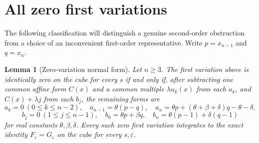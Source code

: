 \documentclass[11pt]{article}
\newtheorem{lemma}[theorem]{Lemma}
\begin{document}
\section{All zero first variations}

The following classification will distinguish a genuine second-order
obstruction from a choice of an inconvenient first-order representative.
Write $p=x_{n-1}$ and $q=x_n$.

\begin{lemma}[Zero-variation normal form]
Let $n\ge3$. The first variation above is identically zero on the cube
for every $s$ if and only if, after subtracting one common affine form
$C(x)$ and a common multiple $\lambda u_k(x)$ from each $a_k$, and
$C(x)+\lambda j$ from each $b_j$, the remaining forms are
\[
 a_k=0\ (0\le k\le n-2),\quad
 a_{n-1}=\theta(p-q),\quad
 a_n=\theta p+(\theta+\beta+\delta)q-\theta-\delta,
\]
\[
 b_j=0\ (1\le j\le n-1),\quad
 b_0=\theta p+\beta q,\quad
 b_n=\theta(p-1)+\delta(q-1)
\]
for real constants $\theta,\beta,\delta$.
Every such zero first variation integrates to the exact identity
$F_\varepsilon=G_\varepsilon$ on the cube for every $s,\varepsilon$.
\end{lemma}
\end{document}

